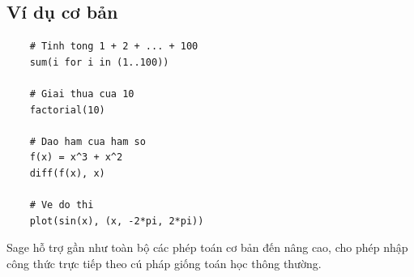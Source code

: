 \subsection*{Ví dụ cơ bản}

\begin{lstlisting}
	# Tinh tong 1 + 2 + ... + 100
	sum(i for i in (1..100))
	
	# Giai thua cua 10
	factorial(10)
	
	# Dao ham cua ham so
	f(x) = x^3 + x^2
	diff(f(x), x)
	
	# Ve do thi
	plot(sin(x), (x, -2*pi, 2*pi))
\end{lstlisting}

Sage hỗ trợ gần như toàn bộ các phép toán cơ bản đến nâng cao, cho phép nhập công thức trực tiếp theo cú pháp giống toán học thông thường.

